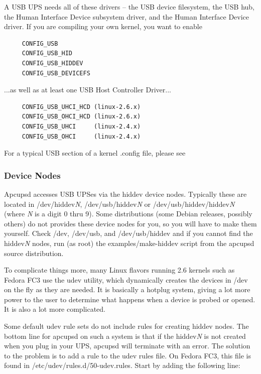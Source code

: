 A USB UPS needs all of these drivers {--} the USB device filesystem, the USB
hub, the Human Interface Device subsystem driver, and the Human Interface
Device driver. If you are compiling your own kernel, you want to enable

\begin{verbatim}
     CONFIG_USB
     CONFIG_USB_HID
     CONFIG_USB_HIDDEV
     CONFIG_USB_DEVICEFS
\end{verbatim}

...as well as at least one USB Host Controller Driver...

\begin{verbatim}
     CONFIG_USB_UHCI_HCD (linux-2.6.x)
     CONFIG_USB_OHCI_HCD (linux-2.6.x)
     CONFIG_USB_UHCI     (linux-2.4.x)
     CONFIG_USB_OHCI     (linux-2.4.x)
\end{verbatim}

For a typical USB section of a kernel .config file, please see

\subsubsection*{Device Nodes}

Apcupsd accesses USB UPSes via the hiddev device nodes. Typically these are
located in /dev/hiddev{\it N}, /dev/usb/hiddev{\it N} or
/dev/usb/hiddev/hiddev{\it N} (where {\it N} is a digit 0 thru 9). Some 
distributions (some Debian releases, possibly others) do not provides these
device nodes for you, so you will have to make them yourself. Check /dev, 
/dev/usb, and /dev/usb/hiddev and if you  cannot find the hiddev{\it N} nodes,
run (as root) the examples/make-hiddev script from the apcupsd source distribution.

To complicate things more, many Linux flavors running 2.6 kernels such as
Fedora FC3 use the udev utility, which dynamically creates the devices in /dev
on the fly as they are needed. It is basically a hotplug system, giving a lot
more power to the user to determine what happens when a device is probed or 
opened. It is also a lot more complicated.  

Some default udev rule sets do not include rules for creating hiddev nodes.
The bottom line for apcupsd on such a system is that if the
hiddev{\it N} is not created when you plug in your UPS, apcupsd will terminate
with an error. The solution to the problem is to add a rule to the udev rules
file.  On Fedora FC3, this file is found in /etc/udev/rules.d/50-udev.rules.
Start by adding the following line:

